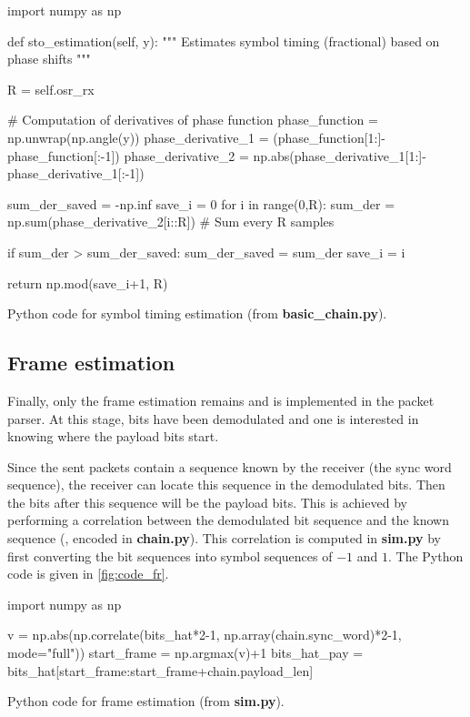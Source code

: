 \begin{listing}[H]
\begin{python}
import numpy as np

def sto_estimation(self, y):
    """
    Estimates symbol timing (fractional) based on phase shifts
    """

    R = self.osr_rx

    # Computation of derivatives of phase function
    phase_function = np.unwrap(np.angle(y))
    phase_derivative_1 = (phase_function[1:]-phase_function[:-1])
    phase_derivative_2 = np.abs(phase_derivative_1[1:]-phase_derivative_1[:-1])

    sum_der_saved = -np.inf
    save_i = 0
    for i in range(0,R):
        sum_der = np.sum(phase_derivative_2[i::R]) # Sum every R samples

        if sum_der > sum_der_saved:
            sum_der_saved = sum_der
            save_i = i

    return np.mod(save_i+1, R)

\end{python}
\caption{Python code for symbol timing estimation (from \textbf{basic\_chain.py}).}
\label{fig:code_symb}
\end{listing}


\subsection{Frame estimation}
Finally, only the frame estimation remains and is implemented in the packet parser. At this stage, bits have been demodulated and one is interested in knowing where the payload bits start.

Since the sent packets contain a sequence known by the receiver (the sync word sequence), the receiver can locate this sequence in the demodulated bits. Then the bits after this sequence will be the payload bits. This is achieved by performing a correlation between the demodulated bit sequence and the known sequence (, encoded in \textbf{chain.py}). This correlation is computed in \textbf{sim.py} by first converting the bit sequences into symbol sequences of $-1$ and $1$. The Python code is given in \autoref{fig:code_fr}.
\begin{listing}[H]
\begin{python}
import numpy as np

v = np.abs(np.correlate(bits_hat*2-1, np.array(chain.sync_word)*2-1, mode="full"))
start_frame = np.argmax(v)+1
bits_hat_pay = bits_hat[start_frame:start_frame+chain.payload_len]

\end{python}
\caption{Python code for frame estimation (from \textbf{sim.py}).}
\label{fig:code_fr}
\end{listing}

